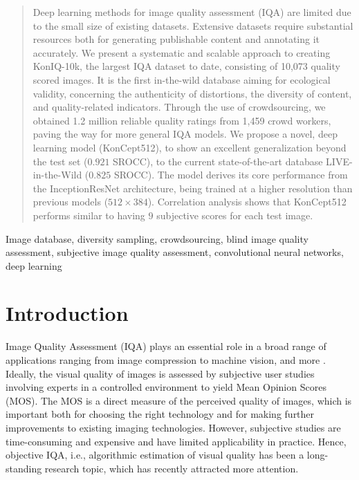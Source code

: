 \documentclass[10pt,journal,compsoc]{IEEEtran}
\begin{document}
\begin{abstract}
Deep learning methods for image quality assessment (IQA) are limited due to the small size of existing datasets. Extensive datasets require substantial resources both for generating publishable content and annotating it accurately.
We present a systematic and scalable approach to creating KonIQ-10k, the largest IQA dataset to date, consisting of 10,073 quality scored images. It is the first in-the-wild database aiming for ecological validity, concerning the authenticity of distortions, the diversity of content, and quality-related indicators. Through the use of crowdsourcing, we obtained 1.2 million reliable quality ratings from 1,459 crowd workers, paving the way for more general IQA models.
We propose a novel, deep learning model (KonCept512), to show an excellent generalization beyond the test set ($0.921$ SROCC), to the current state-of-the-art database LIVE-in-the-Wild ($0.825$ SROCC). The model derives its core performance from the InceptionResNet architecture, being trained at a higher resolution than previous models ($512\times384$). Correlation analysis shows that KonCept512 performs similar to having $9$ subjective scores for each test image.

\end{abstract}
\begin{IEEEkeywords}
Image database, diversity sampling, crowdsourcing, blind image quality assessment, subjective image quality assessment, convolutional neural networks, deep learning
\end{IEEEkeywords}

\IEEEpeerreviewmaketitle

\section{Introduction}
Image Quality Assessment (IQA) plays an essential role in a broad range of applications ranging from image compression to machine vision, and more \cite{wang2011applications,Kopilovic_2005_Sziranyi, dodge2016understanding,men2019visual}. 
Ideally, the visual quality of images is assessed by subjective user studies involving experts in a controlled environment to yield Mean Opinion Scores (MOS). The MOS is a direct measure of the perceived quality of images, which is important both for choosing the right technology and for making further improvements to existing imaging technologies. However, subjective studies are time-consuming and expensive and have limited applicability in practice. Hence, objective IQA,  i.e., algorithmic estimation of visual quality has been a long-standing research topic, which has recently attracted more attention.
\end{document}
